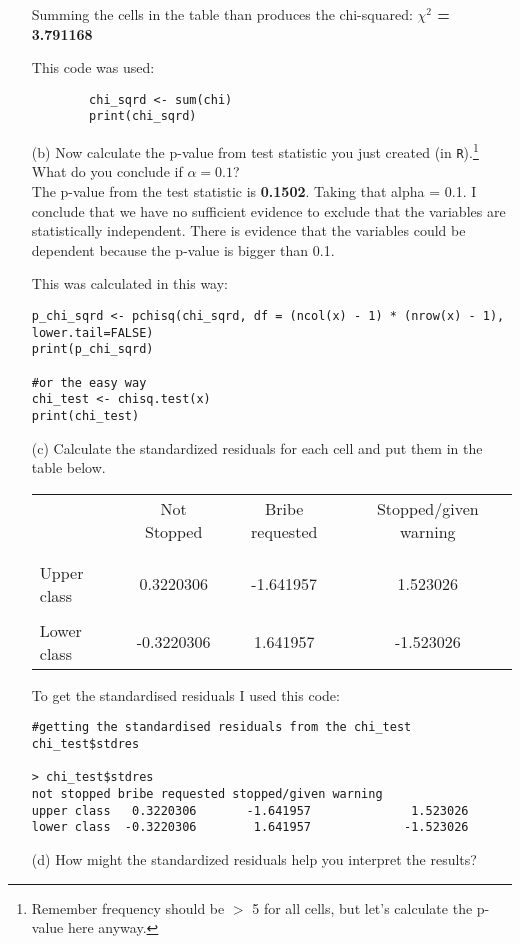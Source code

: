 \documentclass[12pt,letterpaper]{article}
\begin{document}
\begin{enumerate}
	Summing the cells in the table than produces the chi-squared: \textbf{$\chi^2$ = 3.791168} 
	
	This code was used:
		\begin{verbatim}
		chi_sqrd <- sum(chi)
		print(chi_sqrd)
	\end{verbatim}
	\pagebreak
	
	\item [(b)]
	Now calculate the p-value from  test statistic you just created (in \texttt{R}).\footnote{Remember frequency should be $>$ 5 for all cells, but let's calculate the p-value here anyway.}  What do you conclude if $\alpha = 0.1$?\\
	
	The p-value from the test statistic is \textbf{0.1502}. Taking that alpha = 0.1. I conclude that we have no sufficient evidence to exclude that the variables are statistically independent. There is evidence that the variables could be dependent because the p-value is bigger than 0.1.
	
	This was calculated in this way:
	\begin{verbatim}
p_chi_sqrd <- pchisq(chi_sqrd, df = (ncol(x) - 1) * (nrow(x) - 1), 
lower.tail=FALSE)
print(p_chi_sqrd)

#or the easy way
chi_test <- chisq.test(x)
print(chi_test)
	\end{verbatim}

	
	\newpage
	\item [(c)] Calculate the standardized residuals for each cell and put them in the table below.
	\vspace{1cm}
	
	\begin{table}[h]
		\centering
		\begin{tabular}{l | c c c }
			& Not Stopped & Bribe requested & Stopped/given warning \\
			\\[-1.8ex] 
			\hline \\[-1.8ex]
			Upper class   & 0.3220306 &  -1.641957 & 1.523026 \\
			\\
			Lower class  &  -0.3220306 &  1.641957 & -1.523026  \\
		\end{tabular}
	\end{table}

To get the standardised residuals I used this code:
\begin{verbatim}
#getting the standardised residuals from the chi_test
chi_test$stdres

> chi_test$stdres              
not stopped bribe requested stopped/given warning
upper class   0.3220306       -1.641957              1.523026
lower class  -0.3220306        1.641957             -1.523026
\end{verbatim}
	
	\vspace{.5cm}
	\item [(d)] How might the standardized residuals help you interpret the results?  
\end{enumerate}
\end{document}
